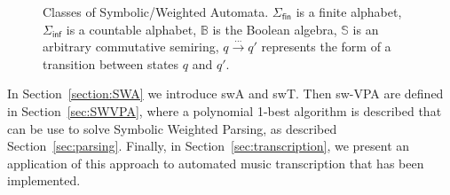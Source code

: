 \documentclass[runningheads]{llncs}
\def\SWT{\textsf{swT}\xspace}
\def\SWA{\textsf{swA}\xspace}
\def\SWVPA{\textsf{sw-VPA}\xspace}
\begin{document}
\begin{figure}
\centering
{}
\caption{Classes of Symbolic/Weighted Automata. 
$\Sigma_\mathsf{fin}$ is a finite alphabet, 
$\Sigma_\mathsf{inf}$ is a countable alphabet,
$\mathbb{B}$ is the Boolean algebra, 
$\mathbb{S}$ is an arbitrary commutative semiring, 
$q \xrightarrow{\dots} q'$ represents the form of a transition between states $q$ and $q'$.}
\label{fig:hierarchy}  
\end{figure}


In Section~\ref{section:SWA} we introduce \SWA and \SWT.
Then \SWVPA are defined in Section~\ref{sec:SWVPA}, 
where a polynomial 1-best algorithm is described that can be use to solve
Symbolic Weighted Parsing, as described Section~\ref{sec:parsing}.
Finally, in Section~\ref{sec:transcription}, we present an application 
of this approach to automated music transcription that has been implemented.
\end{document}
